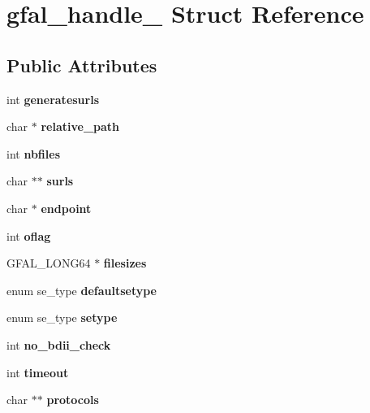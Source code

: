 \section{gfal\_\-handle\_\- Struct Reference}
\label{structgfal__handle__}
\subsection*{Public Attributes}
\begin{DoxyCompactItemize}
\item 
int {\bfseries generatesurls}\label{structgfal__handle___a58c19a9564a1808e18bd3c6c0c000de5}

\item 
char $\ast$ {\bfseries relative\_\-path}\label{structgfal__handle___a3509bdf9c7212a9c06973336c85b75c1}

\item 
int {\bfseries nbfiles}\label{structgfal__handle___a47833ab65de400edeff7bbd4c90beba8}

\item 
char $\ast$$\ast$ {\bfseries surls}\label{structgfal__handle___ae01fd03173194c91bd5ae861333da7b5}

\item 
char $\ast$ {\bfseries endpoint}\label{structgfal__handle___aaf4ca8bf61a77d1e97cfcc0786c1c960}

\item 
int {\bfseries oflag}\label{structgfal__handle___a4c6899724680d53a40416a9f3f9cec8f}

\item 
GFAL\_\-LONG64 $\ast$ {\bfseries filesizes}\label{structgfal__handle___a385dc8bc097f209829a9d5cb23020790}

\item 
enum se\_\-type {\bfseries defaultsetype}\label{structgfal__handle___ad73b945ad78ba6ee47ad6fa84f09eaf3}

\item 
enum se\_\-type {\bfseries setype}\label{structgfal__handle___a6980443d3c2236f835f0441dcb00f38f}

\item 
int {\bfseries no\_\-bdii\_\-check}\label{structgfal__handle___a8b2dca6478db29078e41615c7851cefd}

\item 
int {\bfseries timeout}\label{structgfal__handle___a272d63990aefb77b8fa3f0cfbfad7af9}

\item 
char $\ast$$\ast$ {\bfseries protocols}\label{structgfal__handle___afbd0236a8b7e2099db678380a256d8ac}


\end{DoxyCompactItemize}
